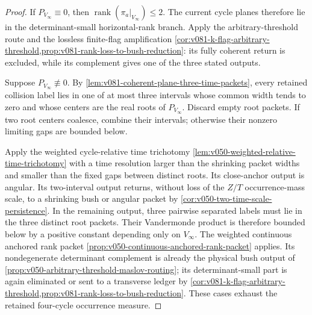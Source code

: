 \documentclass[10pt]{article}
\newcommand{\rank}{\operatorname{rank}}
\begin{document}
\begin{proof}
If \(P_{V_\infty}\equiv0\), then
\(\rank(\pi_a|_{V_\infty})\le2\).  The current cycle planes therefore lie in the determinant-small
horizontal-rank branch.  Apply the arbitrary-threshold route and the lossless finite-flag
amplification
\cref{cor:v081-k-flag-arbitrary-threshold,prop:v081-rank-loss-to-bush-reduction}: its fully coherent
return is excluded, while its complement gives one of the three stated outputs.

Suppose \(P_{V_\infty}\not\equiv0\).  By
\cref{lem:v081-coherent-plane-three-time-packets}, every retained collision label lies in one of at
most three intervals whose common width tends to zero and whose centers are the real roots of
\(P_{V_\infty}\).  Discard empty root packets.  If two root centers coalesce, combine their
intervals; otherwise their nonzero limiting gaps are bounded below.

Apply the weighted cycle-relative time trichotomy
\cref{lem:v050-weighted-relative-time-trichotomy} with a time resolution larger than the shrinking
packet widths and smaller than the fixed gaps between distinct roots.  Its close-anchor output is
angular.  Its two-interval output returns, without loss of the \(Z/T\) occurrence-mass scale, to a
shrinking bush or angular packet by
\cref{cor:v050-two-time-scale-persistence}.  In the remaining output, three pairwise separated
labels must lie in the three distinct root packets.  Their Vandermonde product is therefore bounded
below by a positive constant depending only on \(V_\infty\).  The weighted continuous anchored rank
packet
\cref{prop:v050-continuous-anchored-rank-packet} applies.  Its nondegenerate determinant complement
is already the physical bush output of
\cref{prop:v050-arbitrary-threshold-maslov-routing}; its determinant-small part is again eliminated
or sent to a transverse ledger by
\cref{cor:v081-k-flag-arbitrary-threshold,prop:v081-rank-loss-to-bush-reduction}.  These cases exhaust
the retained four-cycle occurrence measure.
\end{proof}
\end{document}
